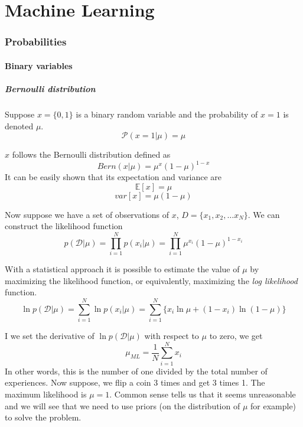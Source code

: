 \part{Machine Learning}

\section{Probabilities}

\subsection{Binary variables}

\subsubsection{Bernoulli distribution}

Suppose $x = \{0, 1\}$ is a binary random variable and the probability of $x = 1$ is denoted $\mu$.
\begin{equation}
    \mathcal{P}(x=1|\mu) = \mu
\end{equation}

$x$ follows the Bernoulli distribution defined as
\begin{equation}
    Bern(x|\mu) = \mu^x (1-\mu)^{1-x}
\end{equation}
It can be easily shown that its expectation and variance are
\begin{equation}
    \mathbb{E}[x] = \mu
\end{equation}
\begin{equation}
    var[x] = \mu(1-\mu)
\end{equation}

Now suppose we have a set of observations of $x$, $D = \{x_1, x_2, \dots x_N\}$. We can construct the likelihood function
\begin{equation}
    p(\mathcal{D}|\mu) = \prod_{i=1}^{N} p(x_i|\mu) = \prod_{i=1}^{N} \mu^{x_i} (1-\mu)^{1-x_i}
\end{equation}

With a statistical approach it is possible to estimate the value of $\mu$ by maximizing the likelihood function, or equivalently, maximizing the \textit{log likelihood} function.
\begin{equation}
    \ln{p(\mathcal{D}|\mu)}=\sum_{i=1}^{N} \ln{p(x_i|\mu)} = \sum_{i=1}^{N} \{x_i \ln{\mu} + (1-x_i) \ln{(1-\mu)}\}
\end{equation}

I we set the derivative of $\ln{p(\mathcal{D}|\mu)}$ with respect to $\mu$ to zero, we get 
\begin{equation}
    \mu_{ML} = \frac{1}{N}\sum_{i=1}^N x_i
\end{equation}
In other words, this is the number of one divided by the total number of experiences.
Now suppose, we flip a coin 3 times and get 3 times 1. The maximum likelihood is $\mu = 1$. Common sense tells us that it seems unreasonable and we will see that we need to use priors (on the distribution of $\mu$ for example) to solve the problem.

